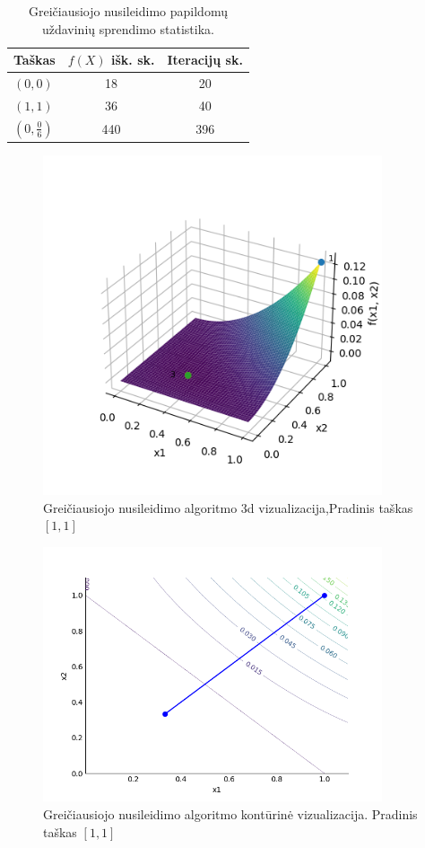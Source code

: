 \documentclass{VUMIFPSkursinis}
\begin{document}
\begin{table}[H]
  \centering
  \caption{Greičiausiojo nusileidimo papildomų uždavinių sprendimo statistika.}
  \begin{tabular}{l c c}
    \hline\hline
    Taškas                         & $f(X)$ išk. sk. & Iteracijų sk. \\ [0.5ex]
    \hline
    $(0, 0)$                       & 18              & 20            \\
    $(1, 1)$                       & 36              & 40            \\
    $({0}, \frac{0}{6})$ & 440             & 396           \\ [1ex]
    \hline
  \end{tabular}
  \label{table:steep-des-add}
\end{table}

\begin{figure}[H]
  \centering
  \includegraphics[width=10cm]{img/steepest_descent_3d_[1.0,1.0].png}
  \caption{Greičiausiojo nusileidimo algoritmo 3d vizualizacija,Pradinis taškas $[1, 1]$}
  \label{img:steep-des-3d-11}
\end{figure}

\begin{figure}[H]
  \centering
  \includegraphics[width=10cm]{img/steepest_descent_contour_[1.0,1.0].png}
  \caption{Greičiausiojo nusileidimo algoritmo kontūrinė vizualizacija. Pradinis taškas $[1, 1]$}
  \label{img:steep-des-co-11}
\end{figure}
\end{document}
